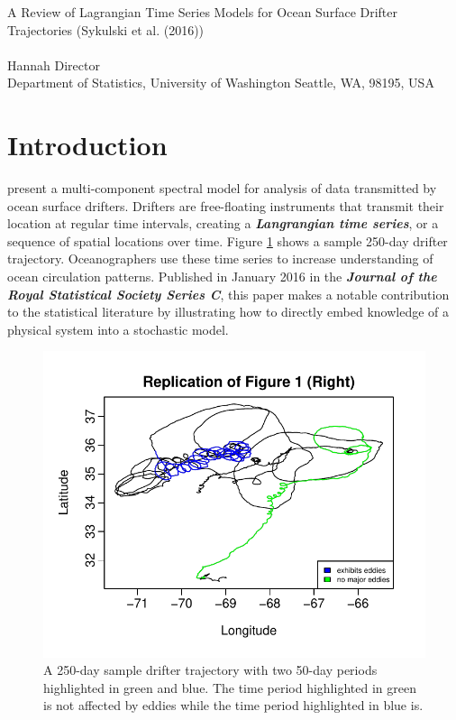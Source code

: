 \documentclass{stat572Style}
\begin{document}

\begin{center}
  {\LARGE A Review of Lagrangian Time Series Models for Ocean Surface Drifter Trajectories (Sykulski et al. (2016))}\\\ \\
  {Hannah Director \\ 
    Department of Statistics, University of Washington Seattle, WA, 98195, USA
  }
\end{center}



\begin{abstract}
  This report reviews the spectral analysis method for modeling ocean surface drifters proposed by \citet{Sykulski2016}. 
  Previous methods to model drifters are discussed along with the authors' model. 
    Where relevant to understanding the model of \citet{Sykulski2016},  spectral analysis, Mat\'{e}rn covariances, the complex-valued Ornstein-Uhlenbeck process, and the Whittle likelihood are reviewed. 
     To conclude the report, we evaluate the strengths and weaknesses of this method. 
  \end{abstract}

\section{Introduction}
\citet{Sykulski2016} present a multi-component spectral model for analysis of data transmitted by ocean surface drifters. 
Drifters are free-floating  instruments that transmit their location at regular time intervals,  creating a \textbf{\it{Langrangian time series}}, or a sequence of spatial locations over time. 
Figure \ref{fig: fig1} shows a sample 250-day drifter trajectory. 
Oceanographers use these time series to increase understanding of  ocean circulation patterns.
Published in January 2016 in the \textbf{\it{Journal of the Royal Statistical Society Series C}}, this paper makes a notable contribution to the statistical literature by illustrating how to directly embed knowledge of a physical system into a stochastic model. 
 \begin{figure}[h!]
  \centering
    \includegraphics[width=.55\textwidth]{ReplicatedFigures/fig1.pdf}
        \caption{A 250-day sample drifter trajectory with two 50-day periods highlighted in green and blue. The time period highlighted in green is not affected by eddies while the time period highlighted in blue is.}
        	\label{fig: fig1}
\end{figure}
 
\end{document}
